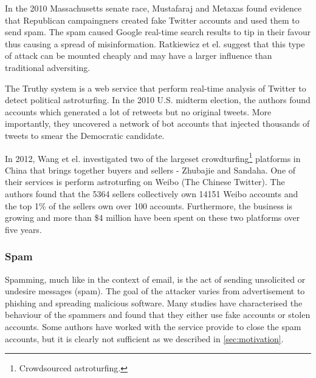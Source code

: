 In the 2010 Massachusetts senate race, Mustafaraj and Metaxas found evidence
that Republican campaingners created fake Twitter accounts and used them to send
spam. The spam caused Google real-time search results to tip in their favour
thus causing a spread of misinformation\cite{mustafaraj2010obscurity}.
Ratkiewicz et el. suggest that this type of attack can be mounted cheaply and
may have a larger influence than traditional
adversiting\cite{ratkiewicz2011truthy}.

The Truthy system\cite{ratkiewicz2011truthy} is a web service that perform
real-time analysis of Twitter to detect political astroturfing. In the 2010
U.S. midterm election, the authors found accounts which generated a lot of
retweets but no original tweets. More importantly, they uncovered a network of
bot accounts that injected thousands of tweets to smear the Democratic candidate.

In 2012, Wang et el. investigated two of the largeset
crowdturfing\footnote{Crowdsourced astroturfing.} platforms in China that brings
together buyers and sellers - Zhubajie and Sandaha. One of their services is
perform astroturfing on Weibo (The Chinese Twitter). The authors found that the
5364 sellers collectively own 14151 Weibo accounts and the top 1\% of the
sellers own over 100 accounts. Furthermore, the business is growing and more
than \$4 million have been spent on these two platforms over five
years\cite{wang2012serf}.

\subsubsection{Spam}
Spamming, much like in the context of email, is the act of sending unsolicited
or undesire messages (spam). The goal of the attacker varies from advertisement
to phishing and spreading malicious software\cite{twittermalware1,
  twittermalware2}. Many studies have characterised the behaviour of the
spammers and found that they either use fake accounts or stolen
accounts\cite{stringhini2010detecting, yang2012analyzing, grier2010spam}. Some
authors have worked with the service provide to close the spam accounts, but it
is clearly not sufficient as we described in \autoref{sec:motivation}.


